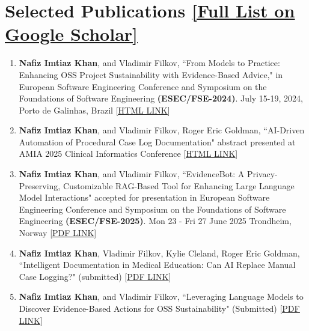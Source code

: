 
\section{Selected Publications \hfill \normalsize{\href{https://scholar.google.com/citations?user=UDxK99QAAAAJ&hl=en}{\textnormal{\underline{[Full List on Google Scholar]}}}}}


\begin{enumerate}
    \item \textbf{Nafiz Imtiaz Khan}, and Vladimir Filkov, “From Models to Practice: Enhancing OSS Project Sustainability with Evidence-Based Advice," in European Software Engineering Conference and Symposium on the Foundations of Software Engineering \textbf{(ESEC/FSE-2024)}. July 15-19, 2024, Porto de Galinhas, Brazil [\href{https://dl.acm.org/doi/abs/10.1145/3663529.3663777}{\underline{HTML LINK}}]

   \item \textbf{Nafiz Imtiaz Khan}, and Vladimir Filkov, Roger Eric Goldman, “AI-Driven Automation of Procedural Case Log Documentation" abstract presented at AMIA 2025 Clinical Informatics Conference [\href{https://amia.secure-platform.com/cic/gallery/rounds/82015/details/17117}{\underline{HTML LINK}}]


    \item \textbf{Nafiz Imtiaz Khan}, and Vladimir Filkov, “EvidenceBot: A Privacy-Preserving, Customizable RAG-Based Tool for Enhancing Large Language Model Interactions" accepted for presentation in European Software Engineering Conference and Symposium on the Foundations of Software Engineering \textbf{(ESEC/FSE-2025)}. Mon 23 - Fri 27 June 2025 Trondheim, Norway [\href{https://drive.google.com/file/d/1lSl8PXrCvKIuOCeOzNE0KIPx-CMAP6OS/view?usp=drive_link}{\underline{PDF LINK}}]


    \item \textbf{Nafiz Imtiaz Khan}, Vladimir Filkov, Kylie Cleland, Roger Eric Goldman, “Intelligent Documentation in Medical Education: Can AI Replace Manual Case Logging?" (submitted) [\href{https://drive.google.com/file/d/1Jy0-V-84rJn07zEMCqw0YxO2zHxhOxmi/view}{\underline{PDF LINK}}]


    \item \textbf{Nafiz Imtiaz Khan}, and Vladimir Filkov, “Leveraging Language Models to Discover Evidence-Based Actions for OSS Sustainability" (Submitted) [\href{https://drive.google.com/file/d/1gGNAqNloJJA4DdH3x1gStLO5DGkcx6M0/view?usp=sharing}{\underline{PDF LINK}}]


\end{enumerate}
